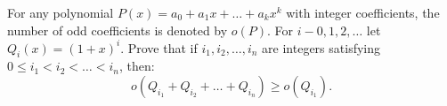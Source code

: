 For any polynomial $P(x)=a_0+a_1x+\ldots+a_kx^k$ with integer coefficients, the number of odd coefficients is denoted by $o(P)$. For $i-0,1,2,\ldots$ let $Q_i(x)=(1+x)^i$. Prove that if $i_1,i_2,\ldots,i_n$ are integers satisfying $0\le i_1<i_2<\ldots<i_n$,  then: \[ o(Q_{i_1}+Q_{i_2}+\ldots+Q_{i_n})\ge o(Q_{i_1}).  \]